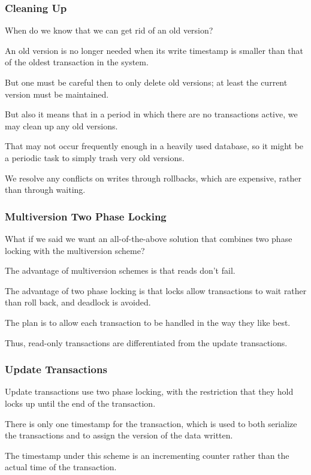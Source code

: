 \begin{frame}
\frametitle{Cleaning Up}

When do we know that we can get rid of an old version? 

An old version is no longer needed when its write timestamp is smaller than that of the oldest transaction in the system. 

But one must be careful then to only delete old versions; at least the current version must be maintained. 

But also it means that in a period in which there are no transactions active, we may clean up any old versions. 

That may not occur frequently enough in a heavily used database, so it might be a periodic task to simply trash very old versions.

We resolve any conflicts on writes through rollbacks, which are expensive, rather than through waiting.

\end{frame}

\begin{frame}
\frametitle{Multiversion Two Phase Locking}

What if we said we want an all-of-the-above solution that combines two phase locking with the multiversion scheme? 

The advantage of multiversion schemes is that reads don't fail. 

The advantage of two phase locking is that locks allow transactions to wait rather than roll back, and deadlock is avoided. 

The plan is to allow each transaction to be handled in the way they like best. 

Thus, read-only transactions are differentiated from the update transactions.


\end{frame}


\begin{frame}
\frametitle{Update Transactions}
Update transactions use two phase locking, with the restriction that they hold locks up until the end of the transaction. 

There is only one timestamp for the transaction, which is used to both serialize the transactions and to assign the version of the data written.

The timestamp under this scheme is an incrementing counter rather than the actual time of the transaction. 

\end{frame}

